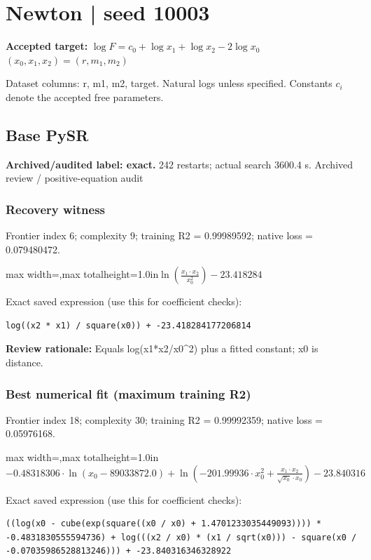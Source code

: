 \documentclass[10pt,letterpaper,landscape]{article}
\begin{document}
\section*{Newton | seed 10003}
\textbf{Accepted target:} $\displaystyle \log F=c_0+\log x_1+\log x_2-2\log x_0$\hfill $(x_0,x_1,x_2)=(r,m_1,m_2)$\par
{\small Dataset columns: r, m1, m2, target. Natural logs unless specified. Constants $c_i$ denote the accepted free parameters.}\par\medskip
\begin{minipage}[t]{0.485\textwidth}
\subsection*{Base PySR}
\textbf{Archived/audited label: exact.} 242 restarts; actual search 3600.4 s.
{\small Archived review / positive-equation audit}
\subsubsection*{Recovery witness}
Frontier index 6; complexity 9; training R2 = 0.99989592; native loss = 0.079480472.
\begin{center}\begin{adjustbox}{max width=\linewidth,max totalheight=1.0in}$\displaystyle \ln{\left(\frac{x_{1} \cdot x_{2}}{x_{0}^{2}} \right)} - 23.418284$\end{adjustbox}\end{center}
{\scriptsize Exact saved expression (use this for coefficient checks):}
\begin{lstlisting}
log((x2 * x1) / square(x0)) + -23.418284177206814
\end{lstlisting}
{\small\textbf{Review rationale:} Equals log(x1*x2/x0\textasciicircum{}2) plus a fitted constant; x0 is distance.}
\subsubsection*{Best numerical fit (maximum training R2)}
Frontier index 18; complexity 30; training R2 = 0.99992359; native loss = 0.05976168.
\begin{center}\begin{adjustbox}{max width=\linewidth,max totalheight=1.0in}$\displaystyle - 0.48318306 \cdot \ln{\left(x_{0} - 89033872.0 \right)} + \ln{\left(- 201.99936 \cdot x_{0}^{2} + \frac{x_{1} \cdot x_{2}}{\sqrt{x_{0}} \cdot x_{0}} \right)} - 23.840316$\end{adjustbox}\end{center}
{\scriptsize Exact saved expression (use this for coefficient checks):}
\begin{lstlisting}
((log(x0 - cube(exp(square((x0 / x0) + 1.4701233035449093)))) * -0.4831830555594736) + log(((x2 / x0) * (x1 / sqrt(x0))) - square(x0 / -0.07035986528813246))) + -23.840316346328922
\end{lstlisting}
\end{minipage}\hfill
\end{document}
